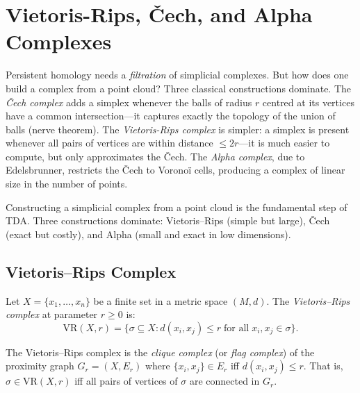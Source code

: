 \chapter{Vietoris-Rips, \v{C}ech, and Alpha Complexes}
\label{ch:complexes}

Persistent homology needs a \emph{filtration} of simplicial complexes. But how does one build a complex from a point cloud? Three classical constructions dominate. The \emph{\v{C}ech complex} adds a simplex whenever the balls of radius $r$ centred at its vertices have a common intersection---it captures exactly the topology of the union of balls (nerve theorem). The \emph{Vietoris-Rips complex} is simpler: a simplex is present whenever all pairs of vertices are within distance $\leq 2r$---it is much easier to compute, but only approximates the \v{C}ech. The \emph{Alpha complex}, due to Edelsbrunner, restricts the \v{C}ech to Vorono\"i cells, producing a complex of linear size in the number of points.

\begin{intuition}
Constructing a simplicial complex from a point cloud is the fundamental
step of TDA. Three constructions dominate: Vietoris--Rips (simple but
large), \v{C}ech (exact but costly), and Alpha (small and exact in low
dimensions).
\end{intuition}

\section{Vietoris--Rips Complex}

\begin{definition}
Let $X = \{x_1, \ldots, x_n\}$ be a finite set in a metric space
$(M, d)$. The \emph{Vietoris--Rips complex} at parameter $r \geq 0$ is:
\[
  \mathrm{VR}(X, r) = \big\{
    \sigma \subseteq X : d(x_i, x_j) \leq r
    \;\text{for all}\; x_i, x_j \in \sigma
  \big\}.
\]
\end{definition}

\begin{remark}
The Vietoris--Rips complex is the \emph{clique complex} (or \emph{flag
complex}) of the proximity graph $G_r = (X, E_r)$ where
$\{x_i, x_j\} \in E_r$ iff $d(x_i, x_j) \leq r$. That is,
$\sigma \in \mathrm{VR}(X, r)$ iff all pairs of vertices of $\sigma$
are connected in $G_r$.
\end{remark}

